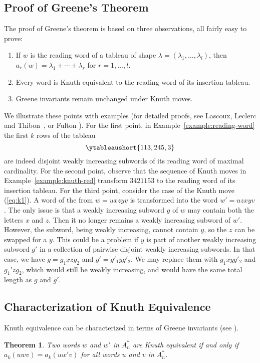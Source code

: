 \documentclass[10pt]{amsproc}
\newtheorem{theorem}{Theorem}[subsection]
\theoremstyle{definition}
\theoremstyle{remark}
\begin{document}
\subsection{Proof of Greene's Theorem}
\label{sec:proof-greene}
The proof of Greene's theorem is based on three observations, all fairly easy to prove:
\begin{enumerate}
\item If $w$ is the reading word of a tableau of shape $\lambda=(\lambda_1,\dotsc,\lambda_l)$, then $a_r(w)=\lambda_1+\dotsb + \lambda_r$ for $r=1,\dotsc,l$.
\item Every word is Knuth equivalent to the reading word of its insertion tableau.
\item Greene invariants remain unchanged under Knuth moves.
\end{enumerate}
We illustrate these points with examples (for detailed proofs, see Lascoux, Leclerc and Thibon~\cite{Lascoux}, or Fulton \cite{fultonyt}).
For the first point, in Example~\ref{example:reading-word} the first $k$ rows of the tableau
\begin{displaymath}
  \ytableaushort{113,245,3}
\end{displaymath}
are indeed disjoint weakly increasing subwords of its reading word of maximal cardinality.
For the second point, observe that the sequence of Knuth moves in Example~\ref{example:knuth-red} transform $3421153$ to the reading word of its insertion tableau.
For the third point, consider the case of the Knuth move (\ref{eq:k1}).
A word of the from $w=uxzyv$ is transformed into the word $w'=uzxyv$.
The only issue is that a weakly increasing subword $g$ of $w$ may contain both the letters $x$ and $z$.
Then it no longer remains a weakly increasing subword of $w'$.
However, the subword, being weakly increasing, cannot contain $y$, so the $z$ can be swapped for a $y$.
This could be a problem if $y$ is part of another weakly increasing subword $g'$ in a collection of pairwise disjoint weakly increasing subwords.
In that case, we have $g=g_1xzg_2$ and $g'=g'_1y g'_2$.
We may replace them with $g_1xyg'_2$ and $g_1'zg_2$, which would still be weakly increasing, and would have the same total length as $g$ and $g'$.
\subsection{Characterization of Knuth Equivalence}
\label{sec:characterization}
Knuth equivalence can be characterized in terms of Greene invariants (see \cite[Theorem~2.15]{plaxique}).
\begin{theorem}
  Two words $w$ and $w'$ in $A_n^*$ are Knuth equivalent if and only if $a_k(uwv)=a_k(uw'v)$ for all words $u$ and $v$ in $A_n^*$.
\end{theorem}
\end{document}
